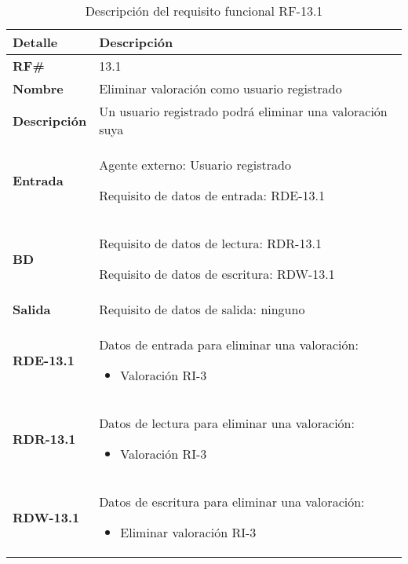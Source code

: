 \begin{table}[H]
    \centering
    \begin{tabular}{|p{3cm}|p{8cm}|}
        \hline
        \rowcolor{lightgray}
        \textbf{Detalle} & \textbf{Descripción} \\
        \hline
        \textbf{RF\#} & 13.1 \\
        \hline
        \textbf{Nombre} & Eliminar valoración como usuario registrado \\
        \hline
        \textbf{Descripción} & Un usuario registrado podrá eliminar una valoración suya \\
        \hline
        \textbf{Entrada} &
        Agente externo: Usuario registrado

        Requisito de datos de entrada: RDE-13.1 \\
        \hline
        \textbf{BD} &
        Requisito de datos de lectura: RDR-13.1

        Requisito de datos de escritura: RDW-13.1 \\
        \hline
        \textbf{Salida} & Requisito de datos de salida: ninguno \\
        \hline
        \textbf{RDE-13.1} & Datos de entrada para eliminar una valoración:
            \begin{itemize}
                \item Valoración RI-3
            \end{itemize} \\
        \hline
        \textbf{RDR-13.1} & Datos de lectura para eliminar una valoración:
            \begin{itemize}
                \item Valoración RI-3
            \end{itemize} \\
        \hline
        \textbf{RDW-13.1} & Datos de escritura para eliminar una valoración:
            \begin{itemize}
                \item Eliminar valoración RI-3
            \end{itemize} \\
        \hline
    \end{tabular}
    \caption{Descripción del requisito funcional RF-13.1}
    \label{tab:rf-13-1}
\end{table}

